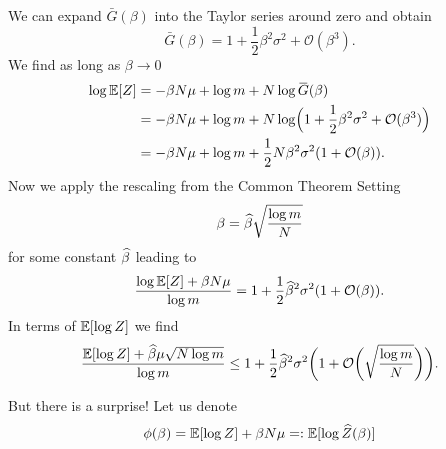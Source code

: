 We can expand $\bar G(\beta)$ into the Taylor series around zero and obtain
\begin{equation}
\bar G(\beta)=1+\frac 12 \beta^2 \sigma^2 + \mathcal{O}(\beta^3).
\end{equation}
We find as long as $\beta\to 0$
\begin{align}
\label{e-EZ}
\log \mathbb{E}[Z]&= -\beta N \mu+ \log m +N\log \mspace{2mu}\overline{\mspace{-2mu}G\mspace{-2mu}}\mspace{2mu}(\beta) \notag \\
  &= -\beta N \mu+ \log m + N \log\Bigl(1+\frac 12 \beta^2 \sigma^2 + \mathcal{O}(\beta^3)\Bigr) \notag \\
  &= -\beta N \mu+ \log m +\frac 12 N \beta^2 \sigma^2(1+ \mathcal{O}(\beta)).
\end{align}
Now we apply the rescaling from the Common Theorem Setting
\begin{equation}
\label{spa2}
\beta=\widehat{\beta} \sqrt{\frac{\log m}{N}}
\end{equation}
for some constant $\widehat{\beta}$ leading to 
\begin{equation}
\label{spa3}
\frac{\log \mathbb{E}[Z]+\beta N \mu}{\log m}= 1+ \frac 12 \widehat{\beta}^2 \sigma^2 (1+\mathcal{O}(\beta)).
\end{equation}
In terms of $\mathbb{E}[\log Z]$ we find
\begin{equation}
\label{spa4}
\frac{\mathbb{E}[ \log Z] +\widehat{\beta} \mu \sqrt{N \log m}}{\log m} \leq
1+ \frac 12 \widehat{\beta}^2 \sigma^2 \biggl(1+\mathcal{O}\biggl(\sqrt{\frac{\log m}{N}}\biggr)\biggr).
\end{equation}

But there is a surprise! Let us denote
\begin{equation}
  \phi(\beta) = \mathbb{E}[\log Z] +\beta N \mu=: \mathbb{E}[\log \widehat{Z}(\beta)]
\end{equation}
%

